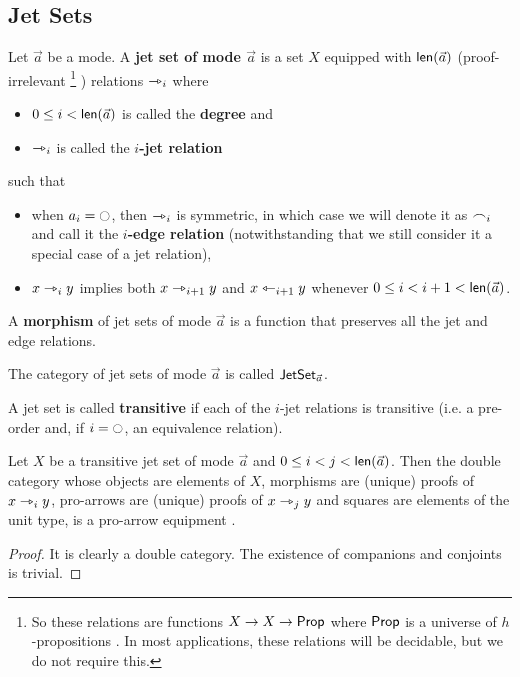 \documentclass[a4paper]{article}
\begin{document}
\subsection{Jet Sets}
\begin{definition} \label{def:jetset}
	Let $\vec a$ be a mode. A \textbf{jet set of mode $\vec a$} is a set $X$ equipped with $\mathsf{len}(\vec a)$ (proof-irrelevant%
	\footnote{So these relations are functions $X \to X \to {\mathsf{Prop}}$ where ${\mathsf{Prop}}$ is a universe of $h$-propositions \cite{hottbook}. In most applications, these relations will be decidable, but we do not require this.}%
	) relations $\rightarrowtriangle_i$ where
	\begin{itemize}
		\item $0 \leq i < \mathsf{len}(\vec a)$ is called the \textbf{degree} and
		\item $\rightarrowtriangle_i$ is called the \textbf{$i$-jet relation}
	\end{itemize}
	such that
	\begin{itemize}
		\item when $a_i = \npolar$, then $\rightarrowtriangle_i$ is symmetric, in which case we will denote it as $\frown_i$ and call it the \textbf{$i$-edge relation} (notwithstanding that we still consider it a special case of a jet relation),
		\item $x \rightarrowtriangle_i y$ implies both $x \rightarrowtriangle_{i+1} y$ and $x \leftarrowtriangle_{i+1} y$ whenever $0 \leq i < i+1 < \mathsf{len}(\vec a)$.
	\end{itemize}
	A \textbf{morphism} of jet sets of mode $\vec a$ is a function that preserves all the jet and edge relations.
	
	The category of jet sets of mode $\vec a$ is called $\mathsf{JetSet}_{\vec a}$.
	
	A jet set is called \textbf{transitive} if each of the $i$-jet relations is transitive (i.e. a pre-order and, if $i = \npolar$, an equivalence relation).
\end{definition}
\begin{proposition}
	Let $X$ be a transitive jet set of mode $\vec a$ and $0 \leq i < j < \mathsf{len}(\vec a)$.
	Then the double category whose objects are elements of $X$, morphisms are (unique) proofs of $x \rightarrowtriangle_i y$, pro-arrows are (unique) proofs of $x \rightarrowtriangle_{j} y$ and squares are elements of the unit type, is a pro-arrow equipment \cite{nlab:proarrow,proarrow1,proarrow2}.
\end{proposition}
\begin{proof}
	It is clearly a double category. The existence of companions and conjoints is trivial.
\end{proof}
\end{document}
